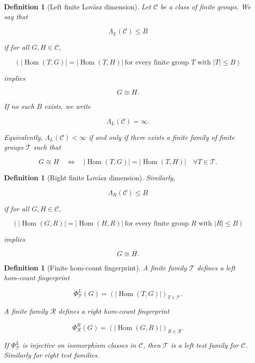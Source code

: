 \documentclass[11pt]{article}
\newtheorem{definition}[theorem]{Definition}
\begin{document}
\begin{definition}[Left finite Lovász dimension]
Let $\mathcal C$ be a class of finite groups. We say that

\[
\Lambda_L(\mathcal C)\le B
\]

if for all $G,H\in\mathcal C$,

\[
\left(
|\operatorname{Hom}(T,G)|=
|\operatorname{Hom}(T,H)|
\ \text{for every finite group }T\text{ with }|T|\le B
\right)
\]

implies

\[
G\cong H.
\]

If no such $B$ exists, we write

\[
\Lambda_L(\mathcal C)=\infty.
\]

Equivalently, $\Lambda_L(\mathcal C)<\infty$ if and only if there exists a finite family of finite groups $\mathcal T$ such that

\[
G\cong H
\quad\Longleftrightarrow\quad
|\operatorname{Hom}(T,G)|=|\operatorname{Hom}(T,H)|
\quad\forall T\in\mathcal T.
\]

\end{definition}

\begin{definition}[Right finite Lovász dimension]
Similarly,

\[
\Lambda_R(\mathcal C)\le B
\]

if for all $G,H\in\mathcal C$,

\[
\left(
|\operatorname{Hom}(G,R)|=
|\operatorname{Hom}(H,R)|
\ \text{for every finite group }R\text{ with }|R|\le B
\right)
\]

implies

\[
G\cong H.
\]

\end{definition}

\begin{definition}[Finite hom-count fingerprint]
A finite family $\mathcal T$ defines a left hom-count fingerprint

\[
\Phi_{\mathcal T}^{L}(G)=
\left(
|\operatorname{Hom}(T,G)|
\right)_{T\in\mathcal T}.
\]

A finite family $\mathcal R$ defines a right hom-count fingerprint

\[
\Phi_{\mathcal R}^{R}(G)
=\left(
|\operatorname{Hom}(G,R)|
\right)_{R\in\mathcal R}.
\]

If $\Phi_{\mathcal T}^{L}$ is injective on isomorphism classes in $\mathcal C$, then $\mathcal T$ is a left test family for $\mathcal C$. Similarly for right test families.

\end{definition}
\end{document}
